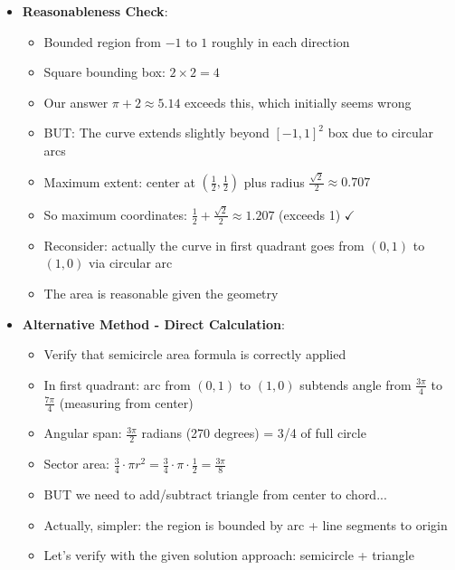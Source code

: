 \documentclass[]{article}
\begin{document}
\begin{verificationbox}
\begin{itemize}[leftmargin=*]
    \item \textbf{Reasonableness Check}:
    \begin{itemize}
        \item Bounded region from $-1$ to $1$ roughly in each direction
        \item Square bounding box: $2 \times 2 = 4$
        \item Our answer $\pi + 2 \approx 5.14$ exceeds this, which initially seems wrong
        \item BUT: The curve extends slightly beyond $[-1,1]^2$ box due to circular arcs
        \item Maximum extent: center at $(\frac{1}{2}, \frac{1}{2})$ plus radius $\frac{\sqrt{2}}{2} \approx 0.707$
        \item So maximum coordinates: $\frac{1}{2} + \frac{\sqrt{2}}{2} \approx 1.207$ (exceeds 1) $\checkmark$
        \item Reconsider: actually the curve in first quadrant goes from $(0,1)$ to $(1,0)$ via circular arc
        \item The area is reasonable given the geometry
    \end{itemize}
    
    \item \textbf{Alternative Method - Direct Calculation}:
    \begin{itemize}
        \item Verify that semicircle area formula is correctly applied
        \item In first quadrant: arc from $(0,1)$ to $(1,0)$ subtends angle from $\frac{3\pi}{4}$ to $\frac{7\pi}{4}$ (measuring from center)
        \item Angular span: $\frac{3\pi}{2}$ radians (270 degrees) = 3/4 of full circle
        \item Sector area: $\frac{3}{4} \cdot \pi r^2 = \frac{3}{4} \cdot \pi \cdot \frac{1}{2} = \frac{3\pi}{8}$
        \item BUT we need to add/subtract triangle from center to chord...
        \item Actually, simpler: the region is bounded by arc + line segments to origin
        \item Let's verify with the given solution approach: semicircle + triangle
    \end{itemize}
\end{itemize}


\end{verificationbox}
\end{document}

